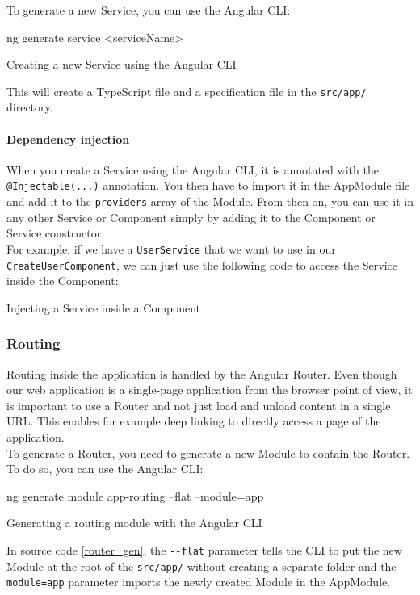 \documentclass[11pt,a4paper]{report}
\newenvironment{code}{\captionsetup{type=listing}}{}
\begin{document}
To generate a new Service, you can use the Angular CLI:
\begin{code}
\begin{shell}
ng generate service <serviceName>
\end{shell}
	\caption{Creating a new Service using the Angular CLI}
\end{code}
This will create a TypeScript file and a specification file in the \verb+src/app/+ directory. 
\paragraph{Dependency injection}
\label{dependency_injection}
When you create a Service using the Angular CLI, it is annotated with the \verb+@Injectable(...)+ annotation. You then have to import it in the AppModule file and add it to the \verb+providers+ array of the Module. From then on, you can use it in any other Service or Component simply by adding it to the Component or Service constructor. \\

For example, if we have a \verb+UserService+ that we want to use in our \verb+CreateUserComponent+, we can just use the following code to access the Service inside the Component:
\begin{code}
	\caption{Injecting a Service inside a Component}
\end{code}
\subsubsection{Routing}
Routing\cite{angular:doc:router} inside the application is handled by the Angular Router. Even though our web application is a single-page application from the browser point of view, it is important to use a Router and not just load and unload content in a single URL. This enables for example deep linking to directly access a page of the application. \\

To generate a Router, you need to generate a new Module to contain the Router. To do so, you can use the Angular CLI:
\begin{code}
	\begin{shell}
ng generate module app-routing --flat --module=app
	\end{shell}
	\caption{Generating a routing module with the Angular CLI}
	\label{router_gen}
\end{code}
In source code \ref{router_gen}, the \verb+--flat+ parameter tells the CLI to put the new Module at the root of the \verb+src/app/+ without creating a separate folder and the \verb+--module=app+ parameter imports the newly created Module in the AppModule. \\
\end{document}
